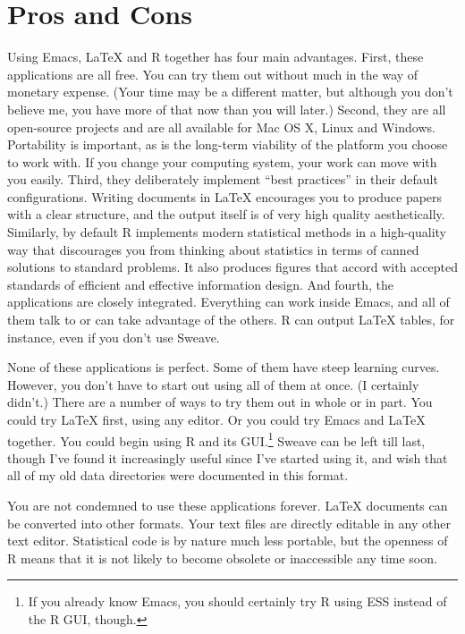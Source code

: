 \documentclass[11pt,article,oneside]{memoir}
\begin{document}
\section{Pros and Cons}  
Using Emacs, LaTeX and R together has four main advantages. First, these applications are all free. You can try them out without much in the way of monetary expense. (Your time may be a different matter, but although you don't believe me, you have more of that now than you will later.) Second, they are all open-source projects and are all available for Mac OS X, Linux and Windows. Portability is important, as is the long-term viability of the platform you choose to work with. If you change your computing system, your work can move with you easily. Third, they deliberately implement ``best practices'' in their default configurations. Writing documents in LaTeX encourages you to produce papers with a clear structure, and the output itself is of very high quality aesthetically. Similarly, by default R implements modern statistical methods in a high-quality way that discourages you from thinking about statistics in terms of canned solutions to standard problems. It also produces figures that accord with accepted standards of efficient and effective information design. And fourth, the applications are closely integrated. Everything can work inside Emacs, and all of them talk to or can take advantage of the others. R can output LaTeX tables, for instance, even if you don't use Sweave.

None of these applications is perfect. Some of them have steep learning curves. However, you don't have to start out using all of them at once. (I certainly didn't.) There are a number of ways to try them out in whole or in part. You could try LaTeX first, using any editor. Or you could try Emacs and LaTeX together. You could begin using R and its GUI.\footnote{If you already know Emacs, you should certainly try R using ESS instead of the R GUI, though.} Sweave can be left till last, though I've found it increasingly useful since I've started using it, and wish that all of my old data directories were documented in this format. 

You are not condemned to use these applications forever. LaTeX documents can be converted into other formats. Your text files are directly editable in any other text editor. Statistical code is by nature much less portable, but the openness of R means that it is not likely to become obsolete or inaccessible any time soon.
\end{document}
